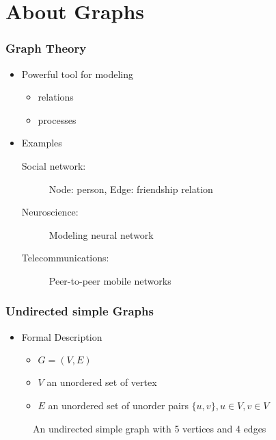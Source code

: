 \section{About Graphs}
\begin{frame}
	\frametitle{Graph Theory}
	\begin{itemize}
		\item Powerful tool for modeling
			\begin{itemize}
				\item relations
				\item processes
			\end{itemize}
		\item Examples
			\begin{description}
				\item [Social network:] Node: person, Edge: friendship relation
				\item [Neuroscience:] Modeling neural network  \cite{BuSp09}
				\item [Telecommunications:] Peer-to-peer mobile networks  \cite{FaCh99}
			\end{description}
	\end{itemize}
\end{frame}

\begin{frame}
	\frametitle{Undirected simple Graphs}
	\begin{itemize}
		\item Formal Description
			\begin{itemize}
				\item $G = (V,E)$
				\item $V$ an unordered set of vertex
				\item $E$ an unordered set of unorder pairs $\{u,v\}, u \in V, v \in V$
			\end{itemize}
	\end{itemize}
	\begin{figure}
		\begin{center}
			
		\end{center}
		\caption{An undirected simple graph with 5 vertices and 4 edges}
	\end{figure}
\end{frame}


